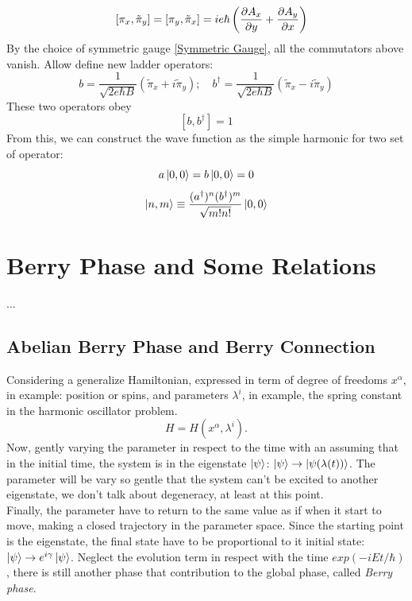 \documentclass[unnumsec,webpdf,modern,large]{mam-authoring-template}%
\theoremstyle{thmstyleone}%
\theoremstyle{thmstyletwo}%
\theoremstyle{thmstylethree}%
\begin{document}
\begin{appendices}
\begin{equation}
\quad [\pi_x,\tilde{\pi}_y] = [\pi_y,\tilde{\pi}_x] = ie\hbar \left(\pdv{A_x}{y} + \pdv{A_y}{x}\right)
\end{equation}
\quad By the choice of symmetric gauge \ref{Symmetric Gauge}, all the commutators above vanish. Allow define new ladder operators:
\begin{equation}
	b = \frac{1}{\sqrt{2 e\hbar B}}(\tilde{\pi}_x + i \tilde{\pi}_y); \quad 	b^\dagger = \frac{1}{\sqrt{2 e\hbar B}}(\tilde{\pi}_x - i \tilde{\pi}_y)
\end{equation}
\quad These two operators obey
$$[b,b^\dagger] = 1$$
\quad From this, we can construct the wave function as the simple harmonic for two set of operator:
$$a \ket{0,0} = b\ket{0,0} = 0$$
$$\ket{n,m} \equiv  \frac{(a^\dagger)^n (b^\dagger)^m}{\sqrt{m!n!}} \ket{0,0}$$
\section{Berry Phase and Some Relations}
...
\subsection{Abelian Berry Phase and Berry Connection}
\quad Considering a generalize Hamiltonian, expressed in term of degree of freedoms \(x^\alpha\), in example: position or spins, and parameters \(\lambda^i\), in example, the spring constant in the harmonic oscillator problem.
$$H= H(x^\alpha, \lambda^i).$$
\quad Now, gently varying the parameter in respect to the time with an assuming that in the initial time, the system is in the eigenstate \(\ket{\psi}\): \(\ket{\psi} \to \ket{\psi(\lambda(t))}\). The parameter will be vary so gentle that the system can't be excited to another eigenstate, we don't talk about degeneracy, at least at this point.\\\null
\quad Finally, the parameter have to return to the same value as if when it start to move, making a closed trajectory in the parameter space. Since the starting point is the eigenstate, the final state have to be proportional to it initial state: \(\ket{\psi} \to e^{i\gamma}\ket{\psi}\). Neglect the evolution term in respect with the time \(exp(-iEt/\hbar)\), there is still another phase that contribution to the global phase, called \textit{Berry phase}.

\end{appendices}
\end{document}
